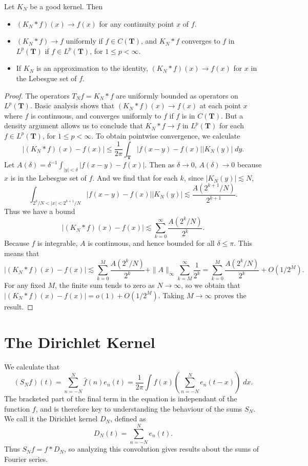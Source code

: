\begin{theorem}
	Let $K_N$ be a good kernel. Then
	\begin{itemize}
		\item $(K_N * f)(x) \to f(x)$ for any continuity point $x$ of $f$.
		\item $(K_N * f) \to f$ uniformly if $f \in C(\mathbf{T})$, and $K_N * f$ converges to $f$ in $L^p(\mathbf{T})$ if $f \in L^p(\mathbf{T})$, for $1 \leq p < \infty$.
		\item If $K_N$ is an approximation to the identity, $(K_N * f)(x) \to f(x)$ for $x$ in the Lebesgue set of $f$.
	\end{itemize}
\end{theorem}
\begin{proof}
	The operators $T_Nf = K_N * f$ are uniformly bounded as operators on $L^p(\mathbf{T})$. Basic analysis shows that $(K_N * f)(x) \to f(x)$ at each point $x$ where $f$ is continuous, and converges uniformly to $f$ if $f$ is in $C(\mathbf{T})$. But a density argument allows us to conclude that $K_N * f \to f$ in $L^p(\mathbf{T})$ for each $f \in L^p(\mathbf{T})$, for $1 \leq p < \infty$. To obtain pointwise convergence, we calculate
	\[ |(K_N * f)(x) - f(x)| \leq \frac{1}{2\pi} \int_{\mathbf{T}} |f(x - y) - f(x)| |K_N(y)|\; dy. \]
	Let $A(\delta) = \delta^{-1} \int_{|y| < \delta} |f(x-y) - f(x)|$. Then as $\delta \to 0$, $A(\delta) \to 0$ because $x$ is in the Lebesgue set of $f$. And we find that for each $k$, since $|K_N(y)| \lesssim N$,
	\[ \int_{2^k/N < |x| < 2^{k+1}/N} |f(x-y) - f(x)| |K_N(y)| \lesssim \frac{A(2^{k+1}/N)}{2^{k+1}}. \]
	Thus we have a bound
	\[ |(K_N * f)(x) - f(x)| \lesssim \sum_{k = 0}^\infty \frac{A(2^k/N)}{2^k}. \]
	Because $f$ is integrable, $A$ is continuous, and hence bounded for all $\delta \leq \pi$. This means that
	\[ |(K_N * f)(x) - f(x)| \lesssim \sum_{k = 0}^M \frac{A(2^k/N)}{2^k} + \| A \|_\infty \sum_{k = M}^\infty \frac{1}{2^k} = \sum_{k = 0}^M \frac{A(2^k/N)}{2^k} + O(1/2^M). \]
	For any fixed $M$, the finite sum tends to zero as $N \to \infty$, so we obtain that $|(K_N * f)(x) - f(x)| = o(1) + O(1/2^M)$. Taking $M \to \infty$ proves the result.
\end{proof}

\section{The Dirichlet Kernel}

We calculate that
%
\[ (S_Nf)(t) = \sum_{n = -N}^N \widehat{f}(n) e_n(t) = \frac{1}{2\pi} \int f(x) \left( \sum_{n = -N}^N e_n(t - x) \right)\; dx.  \]
%
The bracketed part of the final term in the equation is independant of the function $f$, and is therefore key to understanding the behaviour of the sums $S_N$. We call it the Dirichlet kernel $D_N$, defined as
%
\[ D_N(t) = \sum_{n = -N}^N e_n(t). \]
%
Thus $S_N f = f * D_N$, so analyzing this convolution gives results about the sums of Fourier series.

